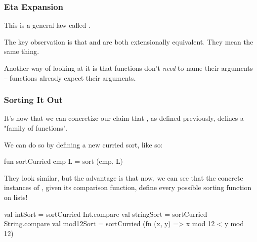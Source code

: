 \documentclass[aspectratio=169, handout]{beamer}
\begin{document}
\begin{frame}[fragile]
  \frametitle{Eta Expansion}

  This is a general law called .

  \pause
  \vspace{\fill}


  \pause
  \vspace{\fill}

  The key observation is that  and  are both
  extensionally equivalent. They mean the same thing.

  \pause
  \vspace{\fill}

  Another way of looking at it is that functions don't \textit{need} to
  name their arguments -- functions already expect their arguments.
\end{frame}


\begin{frame}[fragile]
  \frametitle{Sorting It Out}

  It's now that we can concretize our claim that , as defined previously,
  defines a "family of functions".

  \pause
  \vspace{\fill}

  We can do so by defining a new curried sort, like so:
  \begin{codeblock}
    fun sortCurried cmp L = sort (cmp, L)
  \end{codeblock}

  \pause
  \vspace{\fill}

  They look similar, but the advantage is that now, we can see that the
  concrete instances of , given its comparison function, define
  every possible sorting function on lists!

  \pause
  \vspace{\fill}

  \begin{codeblock}
    val intSort = sortCurried Int.compare
    val stringSort = sortCurried String.compare
    val mod12Sort =
      sortCurried (fn (x, y) => x mod 12 < y mod 12)
  \end{codeblock}
\end{frame}
\end{document}
